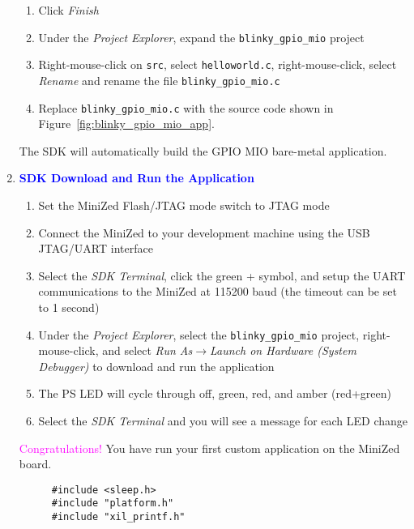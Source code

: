 \begin{enumerate}
\begin{enumerate}
\item Click \emph{Finish}
\item Under the \emph{Project Explorer}, expand the \texttt{blinky\_gpio\_mio} project
\item Right-mouse-click on \texttt{src}, select \texttt{helloworld.c}, right-mouse-click,
select \emph{Rename} and rename the file \texttt{blinky\_gpio\_mio.c}
\item Replace \texttt{blinky\_gpio\_mio.c} with the source code shown in
Figure~\ref{fig:blinky_gpio_mio_app}.
\end{enumerate}

The SDK will automatically build the GPIO MIO bare-metal application.
%
\item \textcolor{blue}{\textbf{SDK Download and Run the Application}}
%
\begin{enumerate}
\item Set the MiniZed Flash/JTAG mode switch to JTAG mode
\item Connect the MiniZed to your development machine using the USB JTAG/UART interface
\item Select the \emph{SDK Terminal}, click the green + symbol, and
setup the UART communications to the MiniZed at 115200 baud (the timeout
can be set to 1 second)
\item Under the \emph{Project Explorer}, select the \texttt{blinky\_gpio\_mio}
project, right-mouse-click, and select \emph{Run As}$\rightarrow$\emph{Launch
on Hardware (System Debugger)} to download and run the application
\item The PS LED will cycle through off, green, red, and amber (red+green)
\item Select the \emph{SDK Terminal} and you will see a message
for each LED change
\end{enumerate}

\textcolor{magenta}{Congratulations!} You have run your first custom application on the MiniZed board.

%
\begin{figure}
\begin{center}
\begin{minipage}{0.8\textwidth}
\begin{lstlisting}
#include <sleep.h>
#include "platform.h"
#include "xil_printf.h"


\end{lstlisting}
\end{minipage}
\end{center}
\end{figure}
\end{enumerate}
